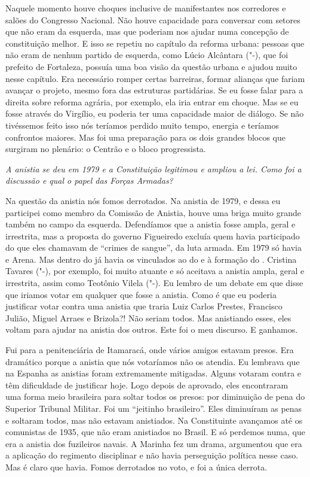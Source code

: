 Naquele momento houve choques inclusive de
manifestantes nos corredores e salões do Congresso Nacional. Não houve
capacidade para conversar com setores que não eram da esquerda, mas que
poderiam nos ajudar numa concepção de constituição melhor. E isso se
repetiu no capítulo da reforma urbana: pessoas que não eram de nenhum
partido de esquerda, como Lúcio Alcântara ("-), que foi prefeito de
Fortaleza, possuía uma boa visão da questão urbana e ajudou muito nesse
capítulo. Era necessário romper certas barreiras, formar alianças que
fariam avançar o projeto, mesmo fora das estruturas partidárias. Se eu
fosse falar para a direita sobre reforma agrária, por exemplo, ela iria
entrar em choque. Mas se eu fosse através do Virgílio, eu poderia ter
uma capacidade maior de diálogo. Se não tivéssemos feito isso nós
teríamos perdido muito tempo, energia e teríamos confrontos maiores. Mas
foi uma preparação para os dois grandes blocos que surgiram no plenário:
o Centrão e o bloco progressista.

\medskip

\noindent\emph{A anistia se deu em 1979 e a Constituição legitimou e ampliou a
lei. Como foi a discussão e qual o papel das Forças Armadas?}

Na questão da anistia nós fomos derrotados. Na anistia
de 1979, e dessa eu participei como membro da Comissão de Anistia, houve
uma briga muito grande também no campo da esquerda. Defendíamos que a
anistia fosse ampla, geral e irrestrita, mas a proposta do governo
Figueiredo excluía quem havia participado do que eles chamavam de
``crimes de sangue'', da luta armada. Em 1979 só havia  e Arena. Mas
dentro do  já havia os vinculados ao do e à formação do .
Cristina Tavares ("-), por exemplo, foi muito atuante e só aceitava
a anistia ampla, geral e irrestrita, assim como Teotônio Vilela
("-). Eu lembro de um debate em que disse que iriamos votar em
qualquer que fosse a anistia. Como é que eu poderia justificar votar
contra uma anistia que traria Luiz Carlos Prestes, Francisco Julião,
Miguel Arraes e Brizola?! Não seriam todos. Mas anistiando esses, eles
voltam para ajudar na anistia dos outros. Este foi o meu discurso. E
ganhamos.

Fui para a penitenciária de Itamaracá, onde vários amigos estavam
presos. Era dramático porque a anistia que nós votaríamos não os
atendia. Eu lembrava que na Espanha as anistias foram extremamente
mitigadas. Alguns votaram contra e têm dificuldade de justificar hoje.
Logo depois de aprovado, eles encontraram uma forma meio brasileira para
soltar todos os presos: por diminuição de pena do Superior Tribunal
Militar. Foi um ``jeitinho brasileiro''. Eles diminuíram as penas e
soltaram todos, mas não estavam anistiados. Na Constituinte avançamos
até os comunistas de 1935, que não eram anistiados no Brasil. E só
perdemos numa, que era a anistia dos fuzileiros navais. A Marinha fez um
drama, argumentou que era a aplicação do regimento disciplinar e não
havia perseguição política nesse caso. Mas é claro que havia. Fomos
derrotados no voto, e foi a única derrota.

